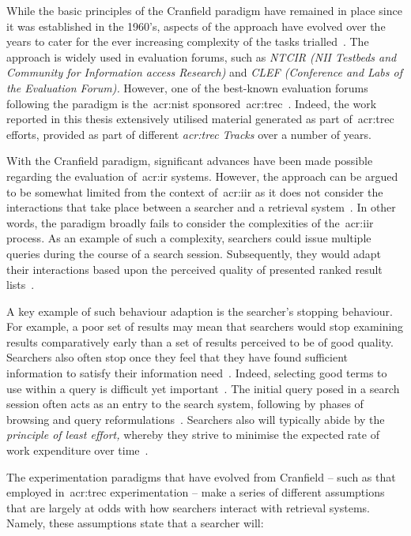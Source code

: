 While the basic principles of the Cranfield paradigm have remained in place since it was established in the 1960's, aspects of the approach have evolved over the years to cater for the ever increasing complexity of the tasks trialled~\citep{harman2010cranfield}. The approach is widely used in evaluation forums, such as \emph{NTCIR (NII Testbeds and Community for Information access Research)} and \emph{CLEF (Conference and Labs of the Evaluation Forum).} However, one of the best-known evaluation forums following the paradigm is the~\gls{acr:nist} sponsored~\gls{acr:trec}~\citep{harman1993trec1}. Indeed, the work reported in this thesis extensively utilised material generated as part of~\gls{acr:trec} efforts, provided as part of different \emph{\gls{acr:trec} Tracks} over a number of years.

With the Cranfield paradigm, significant advances have been made possible regarding the evaluation of~\gls{acr:ir} systems. However, the approach can be argued to be somewhat limited from the context of~\gls{acr:iir} as it does not consider the interactions that take place between a searcher and a retrieval system~\citep{borlund2000evaluation_iir, ingwersen2005theturn}. In other words, the paradigm broadly fails to consider the complexities of the~\gls{acr:iir} process. As an example of such a complexity, searchers could issue multiple queries during the course of a search session. Subsequently, they would adapt their interactions based upon the perceived quality of presented ranked result lists~\citep{moffat2013users_versus_models}.

A key example of such behaviour adaption is the searcher's stopping behaviour. For example, a poor set of results may mean that searchers would stop examining results comparatively early than a set of results perceived to be of good quality. Searchers also often stop once they feel that they have found sufficient information to satisfy their information need~\citep{zach2005enough_is_enough}. Indeed, selecting good terms to use within a query is difficult yet important~\citep{efthimiadis2000query_expansion}. The initial query posed in a search session often acts as an entry to the search system, following by phases of browsing and query reformulations~\citep{marchionini1993information_seeking}. Searchers also will typically abide by the \emph{principle of least effort,} whereby they strive to minimise the expected rate of work expenditure over time~\citep{zipf1949behaviour}.

The experimentation paradigms that have evolved from Cranfield -- such as that employed in~\gls{acr:trec} experimentation -- make a series of different assumptions that are largely at odds with how searchers interact with retrieval systems. Namely, these assumptions state that a searcher will:


